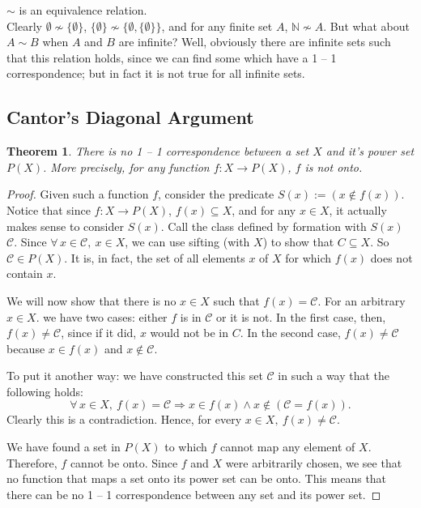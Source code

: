 \documentclass[12pt]{report}
\newcommand{\exercise}{ \noindent{\sc Exercise }\hspace{5pt} }
\newcommand{\fall}{\forall\,}
\newcommand{\nin}{\not \in}
\newcommand{\naturals}{\mathbb{N}}
\newtheorem{theorem}{Theorem}[section]
\begin{document}
\exercise $\sim$ is an equivalence relation.\\

Clearly $\emptyset \not \sim \{\emptyset\}$, $\{\emptyset\} \not \sim
\{\emptyset,\{\emptyset\}\}$, and for any finite set $A$, $\naturals \not \sim
A$. But what about $A \sim B$ when $A$ and $B$ are infinite? Well, obviously
there are infinite sets such that this relation holds, since we can find some
which have a 1 -- 1 correspondence; but in fact it is not true for all
infinite sets.

\subsection{Cantor's Diagonal Argument}

\begin{theorem} 
There is no 1 -- 1 correspondence between a set $X$ and it's power set $P(X)$.
More precisely, for any function $f:X\rightarrow P(X)$, $f$ is not onto.
\end{theorem}

\begin{proof}
Given such a function $f$, consider the predicate $S(x) := (x \nin f(x))$. 
Notice that since
$f:X\rightarrow P(X)$, $f(x) \subseteq X$, and for any $x \in X$, it actually
makes sense to consider $S(x)$. Call the class defined by formation with
$S(x)$ $\mathcal{C}$. Since $\fall x \in \mathcal{C},\ x \in X$, we can use
sifting (with $X$) to show that $C \subseteq X$. So $\mathcal{C} \in P(X)$. It
is, in fact, the set of all elements $x$ of $X$ for which $f(x)$ does not
contain $x$.

We will now show that there is no $x \in X$ such that $f(x) = \mathcal{C}$.
For an arbitrary $x \in X$. we have two cases: either $f$ is in $\mathcal{C}$
or it is not. In the first case, then, $f(x) \neq \mathcal{C}$, since if it
did, $x$ would not be in $C$. In the second case, $f(x) \neq \mathcal{C}$
because $x \in f(x)$ and $x \nin \mathcal{C}$.

To put it another way: we have constructed this set $\mathcal{C}$ in such a
way that the following holds: 
\begin{displaymath}
\fall x \in X,\ f(x) = \mathcal{C} \Rightarrow x \in f(x) \land x \nin
(\mathcal{C} = f(x)).
\end{displaymath}
Clearly this is a contradiction. Hence, for every $x \in X,\ f(x) \neq
\mathcal{C}$. 

We have found a set in $P(X)$ to which $f$ cannot map any element of $X$.
Therefore, $f$ cannot be onto. Since $f$ and $X$ were arbitrarily chosen, we
see that no function that maps a set onto its power set can be onto. This
means that there can be no 1 -- 1 correspondence between any set and its power
set.
\end{proof}
\end{document}
